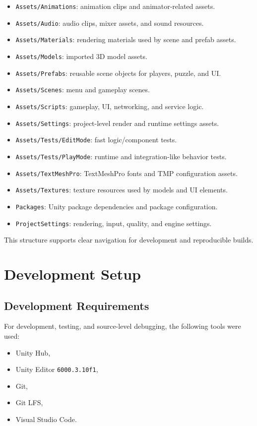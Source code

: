 \begin{itemize}
\item \texttt{Assets/Animations}: animation clips and animator-related assets.
\item \texttt{Assets/Audio}: audio clips, mixer assets, and sound resources.
\item \texttt{Assets/Materials}: rendering materials used by scene and prefab assets.
\item \texttt{Assets/Models}: imported 3D model assets.
\item \texttt{Assets/Prefabs}: reusable scene objects for players, puzzle, and UI.
\item \texttt{Assets/Scenes}: menu and gameplay scenes.
\item \texttt{Assets/Scripts}: gameplay, UI, networking, and service logic.
\item \texttt{Assets/Settings}: project-level render and runtime settings assets.
\item \texttt{Assets/Tests/EditMode}: fast logic/component tests.
\item \texttt{Assets/Tests/PlayMode}: runtime and integration-like behavior tests.
\item \texttt{Assets/TextMeshPro}: TextMeshPro fonts and TMP configuration assets.
\item \texttt{Assets/Textures}: texture resources used by models and UI elements.
\item \texttt{Packages}: Unity package dependencies and package configuration.
\item \texttt{ProjectSettings}: rendering, input, quality, and engine settings.
\end{itemize}

This structure supports clear navigation for development and reproducible builds.

\section{Development Setup}
\subsection*{Development Requirements}
For development, testing, and source-level debugging, the following tools were used:
\begin{itemize}
\item Unity Hub,
\item Unity Editor \texttt{6000.3.10f1},
\item Git,
\item Git LFS,
\item Visual Studio Code.
\end{itemize}

